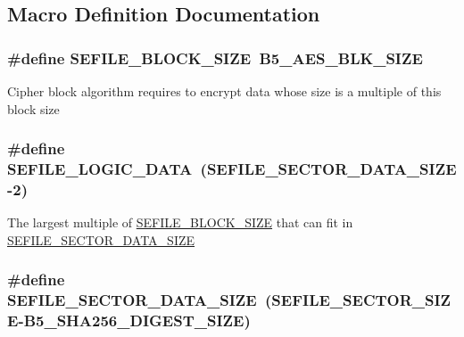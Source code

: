 \subsection{Macro Definition Documentation}
\hypertarget{group___sector_defines_ga9344350dc20df5bbdc5693775c54afcb}{
\subsubsection[{S\-E\-F\-I\-L\-E\-\_\-\-B\-L\-O\-C\-K\-\_\-\-S\-I\-Z\-E}]{\setlength{\rightskip}{0pt plus 5cm}\#define S\-E\-F\-I\-L\-E\-\_\-\-B\-L\-O\-C\-K\-\_\-\-S\-I\-Z\-E~B5\-\_\-\-A\-E\-S\-\_\-\-B\-L\-K\-\_\-\-S\-I\-Z\-E}}\label{group___sector_defines_ga9344350dc20df5bbdc5693775c54afcb}
Cipher block algorithm requires to encrypt data whose size is a multiple of this block size \hypertarget{group___sector_defines_ga460525481b728a7bbad706019c7f2156}{
\subsubsection[{S\-E\-F\-I\-L\-E\-\_\-\-L\-O\-G\-I\-C\-\_\-\-D\-A\-T\-A}]{\setlength{\rightskip}{0pt plus 5cm}\#define S\-E\-F\-I\-L\-E\-\_\-\-L\-O\-G\-I\-C\-\_\-\-D\-A\-T\-A~({\bf S\-E\-F\-I\-L\-E\-\_\-\-S\-E\-C\-T\-O\-R\-\_\-\-D\-A\-T\-A\-\_\-\-S\-I\-Z\-E}-\/2)}}\label{group___sector_defines_ga460525481b728a7bbad706019c7f2156}
The largest multiple of \hyperlink{group___sector_defines_ga9344350dc20df5bbdc5693775c54afcb}{S\-E\-F\-I\-L\-E\-\_\-\-B\-L\-O\-C\-K\-\_\-\-S\-I\-Z\-E} that can fit in \hyperlink{group___sector_defines_ga6961ed45e472749b587136d18eb74b4d}{S\-E\-F\-I\-L\-E\-\_\-\-S\-E\-C\-T\-O\-R\-\_\-\-D\-A\-T\-A\-\_\-\-S\-I\-Z\-E} \hypertarget{group___sector_defines_ga6961ed45e472749b587136d18eb74b4d}{
\subsubsection[{S\-E\-F\-I\-L\-E\-\_\-\-S\-E\-C\-T\-O\-R\-\_\-\-D\-A\-T\-A\-\_\-\-S\-I\-Z\-E}]{\setlength{\rightskip}{0pt plus 5cm}\#define S\-E\-F\-I\-L\-E\-\_\-\-S\-E\-C\-T\-O\-R\-\_\-\-D\-A\-T\-A\-\_\-\-S\-I\-Z\-E~({\bf S\-E\-F\-I\-L\-E\-\_\-\-S\-E\-C\-T\-O\-R\-\_\-\-S\-I\-Z\-E}-\/B5\-\_\-\-S\-H\-A256\-\_\-\-D\-I\-G\-E\-S\-T\-\_\-\-S\-I\-Z\-E)}}\label{group___sector_defines_ga6961ed45e472749b587136d18eb74b4d}
